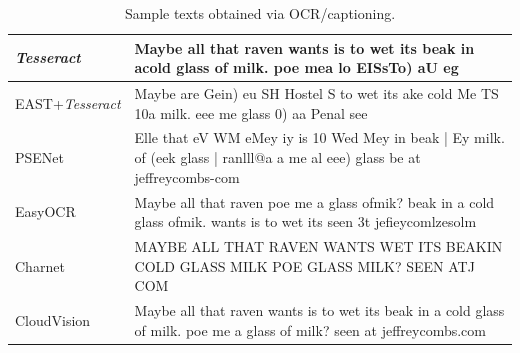\documentclass{zapiski}
\begin{document}
\begin{table}[!tbh]\setlength{\tabcolsep}{2pt}
\begin{tabular}{p{.17\linewidth}|p{.79\linewidth}}
\hline
\emph{Tesseract}\newline  \cite{smith2007overview} & 
Maybe all that raven
wants is to wet its
beak in acold glass of milk.
poe mea lo EISsTo) aU eg
\\\hline
EAST+\newline\emph{Tesseract}\newline\cite{kopeykina2019automatic} & 
Maybe are Gein) eu SH Hostel S to wet its ake cold Me TS 10a milk. eee me glass 0) aa Penal see 
\\\hline
PSENet \newline \cite{wang2019shape} &  Elle that eV WM eMey iy is 10 Wed Mey in beak | Ey milk. of (eek glass | ranlll@a a me al eee) glass be at jeffreycombs-com  \\ \hline
EasyOCR \newline \cite{easyocr} &  Maybe all that raven poe me a glass ofmik? beak in a cold glass ofmik. wants is to wet its seen 3t jefieycomlzesolm  \\ \hline
Charnet \newline \cite{xing2019convolutional} & MAYBE ALL THAT RAVEN WANTS WET ITS BEAKIN COLD GLASS MILK POE GLASS MILK? SEEN ATJ COM 
\\ \hline
CloudVision \newline \cite{otani2018} & Maybe all that raven
wants is to wet its
beak in a cold glass of milk.
poe me a glass of milk?
seen at jeffreycombs.com
 \\\hline
\end{tabular}

\caption{Sample  texts obtained via OCR/captioning.}\label{tab:ocr}
\end{table}
\end{document}
